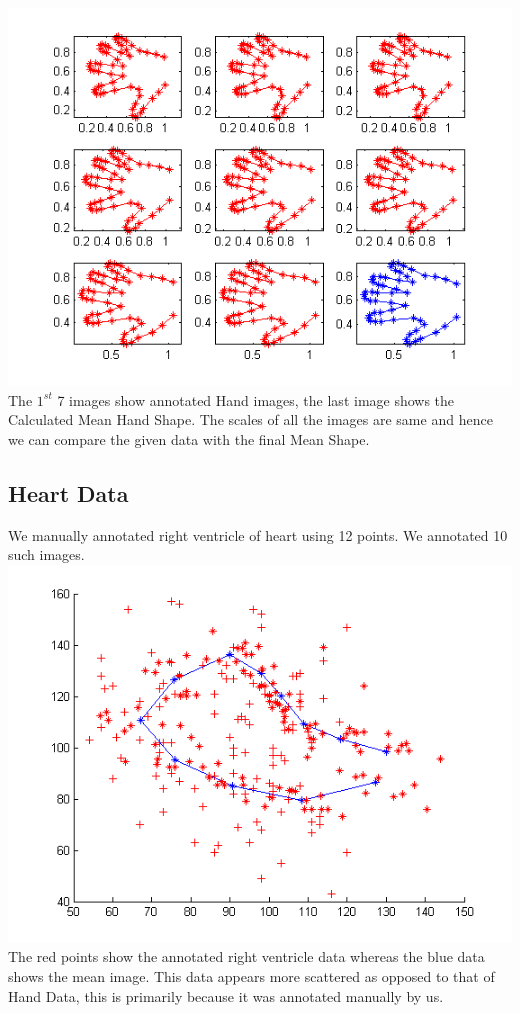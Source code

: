 \documentclass[paper=a4, fontsize=11pt,twoside]{scrartcl}	%
\begin{document}
\includegraphics{HandSubplot.png}
The $1^{st}$ 7 images show annotated Hand images, the last image shows the Calculated Mean Hand Shape. The scales of all the images are same and hence we can compare the given data with the final Mean Shape.

\subsection{Heart Data}
We manually annotated right ventricle of heart using 12 points. We annotated 10 such images.
\includegraphics{HeartMeanwithData.png}
The red points show the annotated right ventricle data whereas the blue data shows the mean image. This data appears more scattered as opposed to that of Hand Data, this is primarily because it was annotated manually by us.
\end{document}
